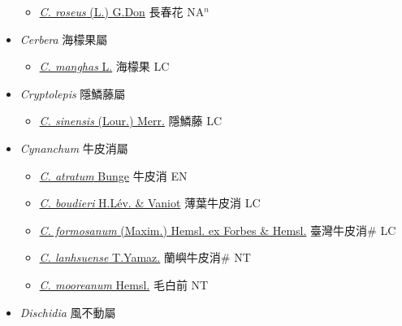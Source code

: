 \begin{itemize}
  \begin{itemize}
        \item[] \href{http://www.theplantlist.org/tpl1.1/search?q=Catharanthus+roseus}{\textit{C. roseus} (L.) G.Don}   長春花 NA$^n$
  \end{itemize}
 \item[] \textit{Cerbera} 海檬果屬
                    
  \begin{itemize}
        \item[] \href{http://www.theplantlist.org/tpl1.1/search?q=Cerbera+manghas}{\textit{C. manghas} L.}   海檬果 LC
  \end{itemize}
 \item[] \textit{Cryptolepis} 隱鱗藤屬
                    
  \begin{itemize}
        \item[] \href{http://www.theplantlist.org/tpl1.1/search?q=Cryptolepis+sinensis}{\textit{C. sinensis} (Lour.) Merr.}   隱鱗藤 LC
  \end{itemize}
 \item[] \textit{Cynanchum} 牛皮消屬
                    
  \begin{itemize}
        \item[] \href{http://www.theplantlist.org/tpl1.1/search?q=Cynanchum+atratum}{\textit{C. atratum} Bunge}   牛皮消 EN
        \item[] \href{http://www.theplantlist.org/tpl1.1/search?q=Cynanchum+boudieri}{\textit{C. boudieri} H.Lév. \& Vaniot}   薄葉牛皮消 LC
        \item[] \href{http://www.theplantlist.org/tpl1.1/search?q=Cynanchum+formosanum}{\textit{C. formosanum} (Maxim.) Hemsl. ex Forbes \& Hemsl.}   臺灣牛皮消\# LC
        \item[] \href{http://www.theplantlist.org/tpl1.1/search?q=Cynanchum+lanhsuense}{\textit{C. lanhsuense} T.Yamaz.}   蘭嶼牛皮消\# NT
        \item[] \href{http://www.theplantlist.org/tpl1.1/search?q=Cynanchum+mooreanum}{\textit{C. mooreanum} Hemsl.}   毛白前 NT
  \end{itemize}
 \item[] \textit{Dischidia} 風不動屬
                    

\end{itemize}
